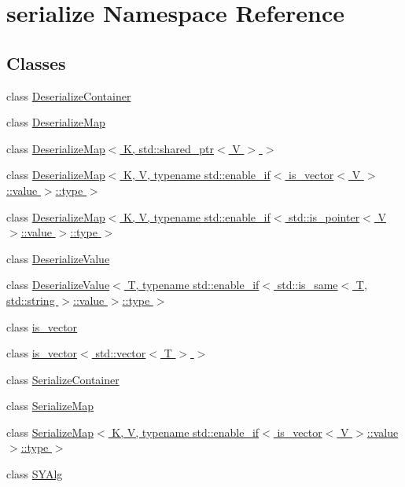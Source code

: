 \hypertarget{namespaceserialize}{}\section{serialize Namespace Reference}
\label{namespaceserialize}
\subsection*{Classes}
\begin{DoxyCompactItemize}
\item 
class \hyperlink{classserialize_1_1_deserialize_container}{Deserialize\+Container}
\item 
class \hyperlink{classserialize_1_1_deserialize_map}{Deserialize\+Map}
\item 
class \hyperlink{classserialize_1_1_deserialize_map_3_01_k_00_01std_1_1shared__ptr_3_01_v_01_4_01_4}{Deserialize\+Map$<$ K, std\+::shared\+\_\+ptr$<$ V $>$ $>$}
\item 
class \hyperlink{classserialize_1_1_deserialize_map_3_01_k_00_01_v_00_01typename_01std_1_1enable__if_3_01is__vected2d1ee1f8886a5a92a6dbc69e18bdcd}{Deserialize\+Map$<$ K, V, typename std\+::enable\+\_\+if$<$ is\+\_\+vector$<$ V $>$\+::value $>$\+::type $>$}
\item 
class \hyperlink{classserialize_1_1_deserialize_map_3_01_k_00_01_v_00_01typename_01std_1_1enable__if_3_01std_1_1ibe6cfa8a2d341f3a0942baedd95196d5}{Deserialize\+Map$<$ K, V, typename std\+::enable\+\_\+if$<$ std\+::is\+\_\+pointer$<$ V $>$\+::value $>$\+::type $>$}
\item 
class \hyperlink{classserialize_1_1_deserialize_value}{Deserialize\+Value}
\item 
class \hyperlink{classserialize_1_1_deserialize_value_3_01_t_00_01typename_01std_1_1enable__if_3_01std_1_1is__sambc4bb2b40dcc8b30285e8bdc35bf8b03}{Deserialize\+Value$<$ T, typename std\+::enable\+\_\+if$<$ std\+::is\+\_\+same$<$ T, std\+::string $>$\+::value $>$\+::type $>$}
\item 
class \hyperlink{classserialize_1_1is__vector}{is\+\_\+vector}
\item 
class \hyperlink{classserialize_1_1is__vector_3_01std_1_1vector_3_01_t_01_4_01_4}{is\+\_\+vector$<$ std\+::vector$<$ T $>$ $>$}
\item 
class \hyperlink{classserialize_1_1_serialize_container}{Serialize\+Container}
\item 
class \hyperlink{classserialize_1_1_serialize_map}{Serialize\+Map}
\item 
class \hyperlink{classserialize_1_1_serialize_map_3_01_k_00_01_v_00_01typename_01std_1_1enable__if_3_01is__vector3a4a5c31f236854fe1872e17684001d1}{Serialize\+Map$<$ K, V, typename std\+::enable\+\_\+if$<$ is\+\_\+vector$<$ V $>$\+::value $>$\+::type $>$}
\item 
class \hyperlink{classserialize_1_1_s_y_alg}{S\+Y\+Alg}
\end{DoxyCompactItemize}
